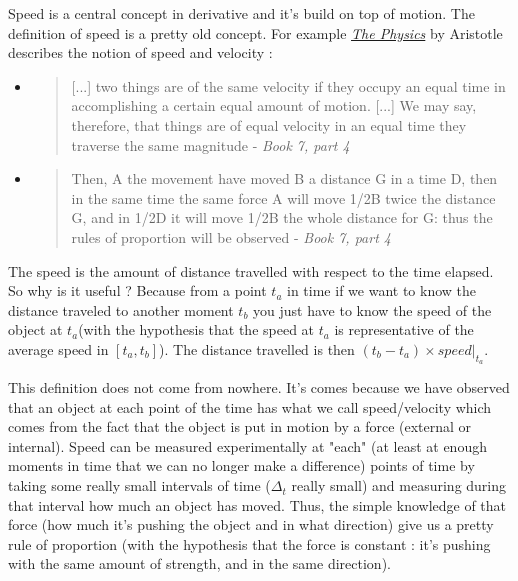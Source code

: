 \documentclass[12pt]{article}
\begin{document}
Speed is a central concept in derivative and it's build on top of motion. The definition of speed is a pretty old concept. For example \href{http://classics.mit.edu/Aristotle/physics.7.vii.html}{\it The Physics} by Aristotle describes the notion of speed and velocity :
\begin{itemize}
    \item
\begin{quote}
[...] two things are of the same velocity if they occupy an equal time in accomplishing a certain equal amount of motion. [...] We may say, therefore, that things are of equal velocity in an equal time they traverse the same magnitude - {\it Book 7, part 4}
\end{quote}

    \item
\begin{quote}
 Then, A the movement have moved B a distance G in a time D, then in the same time the same force A will move 1/2B twice the distance G, and in 1/2D it will move 1/2B the whole distance for G: thus the rules of proportion will be observed - {\it Book 7, part 4}
\end{quote}

\end{itemize}

The speed is the amount of distance travelled with respect to the time elapsed. So why is it useful ? Because from a point $t_a$ in time if we want to know the distance traveled to another moment $t_b$ you just have to know the speed of the object at $t_a$(with the hypothesis that the speed at $t_a$ is representative of the average speed in $[t_a, t_b]$). The distance travelled is then $(t_b-t_a) \times speed|_{t_a}$.

This definition does not come from nowhere. It's comes because we have observed that an object at each point of the time has what we call speed/velocity which comes from the fact that the object is put in motion by a force (external or internal). 
Speed can be measured experimentally at "each" (at least at enough moments in time that we can no longer make a difference) points of time by taking some really small intervals of time ($\Delta_t$ really small) and measuring during that interval how much an object has moved.
Thus, the simple knowledge of that force (how much it's pushing the object and in what direction) give us a pretty rule of proportion (with the hypothesis that the force is constant : it's pushing with the same amount of strength, and in the same direction). 
\end{document}
